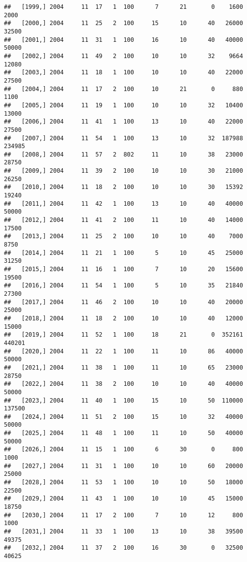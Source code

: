 \documentclass{article}\usepackage[]{graphicx}\usepackage[]{color}
\makeatletter
\newenvironment{kframe}{%
 \def\at@end@of@kframe{}%
 \ifinner\ifhmode%
  \def\at@end@of@kframe{\end{minipage}}%
  \begin{minipage}{\columnwidth}%
 \fi\fi%
 \def\FrameCommand##1{\hskip\@totalleftmargin \hskip-\fboxsep
 \colorbox{shadecolor}{##1}\hskip-\fboxsep
     \hskip-\linewidth \hskip-\@totalleftmargin \hskip\columnwidth}%
 \MakeFramed {\advance\hsize-\width
   \@totalleftmargin\z@ \linewidth\hsize
   \@setminipage}}%
 {\par\unskip\endMakeFramed%
 \at@end@of@kframe}
\newenvironment{knitrout}{}{} %
\makeatother
\begin{document}
\begin{knitrout}
\begin{kframe}
\begin{verbatim}
##   [1999,] 2004     11  17   1  100      7      21       0    1600    2000
##   [2000,] 2004     11  25   2  100     15      10      40   26000   32500
##   [2001,] 2004     11  31   1  100     16      10      40   40000   50000
##   [2002,] 2004     11  49   2  100     10      10      32    9664   12080
##   [2003,] 2004     11  18   1  100     10      10      40   22000   27500
##   [2004,] 2004     11  17   2  100     10      21       0     880    1100
##   [2005,] 2004     11  19   1  100     10      10      32   10400   13000
##   [2006,] 2004     11  41   1  100     13      10      40   22000   27500
##   [2007,] 2004     11  54   1  100     13      10      32  187988  234985
##   [2008,] 2004     11  57   2  802     11      10      38   23000   28750
##   [2009,] 2004     11  39   2  100     10      10      30   21000   26250
##   [2010,] 2004     11  18   2  100     10      10      30   15392   19240
##   [2011,] 2004     11  42   1  100     13      10      40   40000   50000
##   [2012,] 2004     11  41   2  100     11      10      40   14000   17500
##   [2013,] 2004     11  25   2  100     10      10      40    7000    8750
##   [2014,] 2004     11  21   1  100      5      10      45   25000   31250
##   [2015,] 2004     11  16   1  100      7      10      20   15600   19500
##   [2016,] 2004     11  54   1  100      5      10      35   21840   27300
##   [2017,] 2004     11  46   2  100     10      10      40   20000   25000
##   [2018,] 2004     11  18   2  100     10      10      40   12000   15000
##   [2019,] 2004     11  52   1  100     18      21       0  352161  440201
##   [2020,] 2004     11  22   1  100     11      10      86   40000   50000
##   [2021,] 2004     11  38   1  100     11      10      65   23000   28750
##   [2022,] 2004     11  38   2  100     10      10      40   40000   50000
##   [2023,] 2004     11  40   1  100     15      10      50  110000  137500
##   [2024,] 2004     11  51   2  100     15      10      32   40000   50000
##   [2025,] 2004     11  48   1  100     11      10      50   40000   50000
##   [2026,] 2004     11  15   1  100      6      30       0     800    1000
##   [2027,] 2004     11  31   1  100     10      10      60   20000   25000
##   [2028,] 2004     11  53   1  100     10      10      50   18000   22500
##   [2029,] 2004     11  43   1  100     10      10      45   15000   18750
##   [2030,] 2004     11  17   2  100      7      10      12     800    1000
##   [2031,] 2004     11  33   1  100     13      10      38   39500   49375
##   [2032,] 2004     11  37   2  100     16      30       0   32500   40625

\end{verbatim}
\end{kframe}
\end{knitrout}
\end{document}
